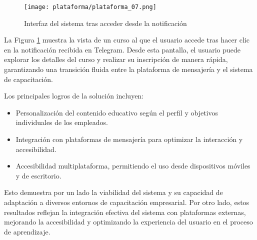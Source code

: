 \begin{figure}[htbp]
    \centering
    \texttt{[image: plataforma/plataforma\_07.png]}
    \caption{Interfaz del sistema tras acceder desde la notificación}
    \label{fig:interfaz_curso_ejemplo}
\end{figure}

La Figura \ref{fig:interfaz_curso_ejemplo} muestra la vista de un curso al que
el usuario accede tras hacer clic en la notificación recibida en Telegram. Desde
esta pantalla, el usuario puede explorar los detalles del curso y realizar su
inscripción de manera rápida, garantizando una transición fluida entre la
plataforma de mensajería y el sistema de capacitación.

Los principales logros de la solución incluyen:
\begin{itemize}
    \item Personalización del contenido educativo según el perfil y objetivos
    individuales de los empleados.
    \item Integración con plataformas de mensajería para optimizar la
    interacción y accesibilidad.
    \item Accesibilidad multiplataforma, permitiendo el uso desde dispositivos
    móviles y de escritorio.
\end{itemize}

Esto demuestra por un lado la viabilidad del sistema y su capacidad de
adaptación a diversos entornos de capacitación empresarial. Por otro lado, estos
resultados reflejan la integración efectiva del sistema con plataformas
externas, mejorando la accesibilidad y optimizando la experiencia del usuario en
el proceso de aprendizaje.
